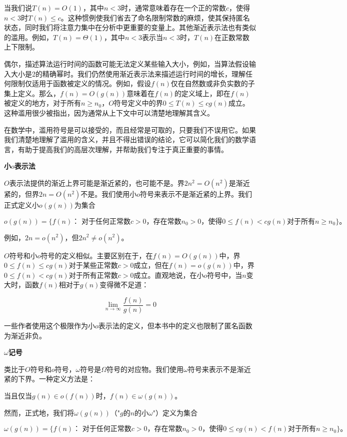 \documentclass[lang=cn,newtx,10pt,scheme=chinese]{elegantbook}
\begin{document}
当我们说$T(n)=O(1)$，其中$n<3$时，通常意味着存在一个正的常数$c$，使得$n<3$时$T(n) \leq c$。这种惯例使我们省去了命名限制常数的麻烦，使其保持匿名状态，同时我们将注意力集中在分析中更重要的变量上。其他渐近表示法也有类似的滥用。例如，$T(n)=\Theta(1)$，其中$n<3$表示当$n<3$时，$T(n)$在正数常数上下限制。

偶尔，描述算法运行时间的函数可能无法定义某些输入大小，例如，当算法假设输入大小是2的精确幂时。我们仍然使用渐近表示法来描述运行时间的增长，理解任何限制仅适用于函数被定义的情况。例如，假设$f(n)$仅在自然数或非负实数的子集上定义。那么，$f(n)=O(g(n))$意味着在$f(n)$的定义域上，即在$f(n)$被定义的地方，对于所有$n \geq n_0$，$O$符号定义中的界$0 \leq T(n) \leq c g(n)$成立。这种滥用很少被指出，因为通常从上下文中可以清楚地理解其含义。

在数学中，滥用符号是可以接受的，而且经常是可取的，只要我们不误用它。如果我们清楚地理解了滥用的含义，并且不得出错误的结论，它可以简化我们的数学语言，有助于提高我们的高层次理解，并帮助我们专注于真正重要的事情。

\textbf{小$o$表示法}

$O$表示法提供的渐近上界可能是渐近紧的，也可能不是。界$2 n^2=O\left(n^2\right)$是渐近紧的，但界$2 n=O\left(n^2\right)$不是。我们使用小$o$符号来表示不是渐近紧的上界。我们正式定义小$o(g(n))$为集合

$$
o(g(n))=\{f(n)：\text { 对于任何正常数} c>0，\text{存在常数} n_0>0 \text {，使得} 0 \leq f(n)<c g(n) \text {对于所有} n \geq n_0\}。
$$

例如，$2 n=o\left(n^2\right)$，但$2 n^2 \neq o\left(n^2\right)$。

$O$符号和小$o$符号的定义相似。主要区别在于，在$f(n)=O(g(n))$中，界$0 \leq f(n) \leq c g(n)$对于某些正常数$c>0$成立，但在$f(n)=o(g(n))$中，界$0 \leq f(n)<c g(n)$对于所有正常数$c>0$成立。直观地说，在小$o$符号中，当$n$变大时，函数$f(n)$相对于$g(n)$变得微不足道：

$$
\lim _{n \rightarrow \infty} \frac{f(n)}{g(n)}=0
$$

一些作者使用这个极限作为小$o$表示法的定义，但本书中的定义也限制了匿名函数为渐近非负。

\textbf{$\omega$记号}

类比于$O$符号和$o$符号，$\omega$符号是$\Omega$符号的对应物。我们使用$\omega$符号来表示不是渐近紧的下界。一种定义方法是：

当且仅当$g(n) \in o(f(n))$时，$f(n) \in \omega(g(n))$。

然而，正式地，我们将$\omega(g(n))$（"$g$的$n$的小$\omega$"）定义为集合

$$
\omega(g(n))=\{f(n)：\text { 对于任何正常数} c>0，\text{存在常数} n_0>0 \text {，使得} 0 \leq c g(n)<f(n) \text {对于所有} n \geq n_0\}。
$$
\end{document}
